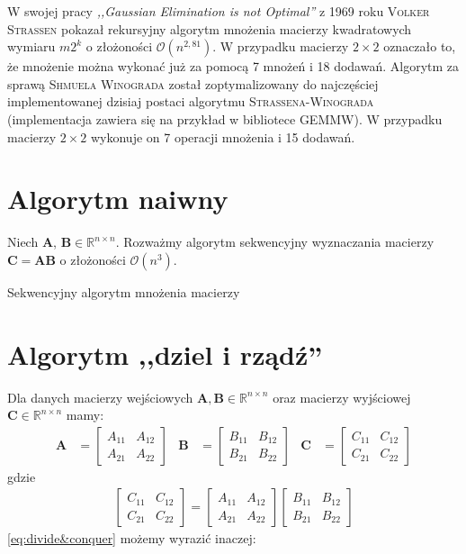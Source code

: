 W swojej pracy \emph{,,Gaussian Elimination is not Optimal''} z 1969 roku \textsc{Volker Strassen} pokazał rekursyjny algorytm mnożenia macierzy kwadratowych wymiaru \(m2^k\) o złożoności \(\mathcal{O}(n^{2,81})\)\cite{Strassen68}. W przypadku macierzy \(2\times 2\) oznaczało to, że mnożenie można wykonać już za pomocą 7 mnożeń i 18 dodawań. Algorytm za sprawą \textsc{Shmuela Winograda} został zoptymalizowany\cite{Winograd}\cite{Loeckx1974} do najczęściej implementowanej dzisiaj postaci algorytmu \textsc{Strassena-Winograda} (implementacja zawiera się na przykład w bibliotece GEMMW\cite{Douglas94gemmw}). W przypadku macierzy \(2\times 2\) wykonuje on 7 operacji mnożenia i 15 dodawań\cite{DBLP:journals/corr/abs-1202-3173}.
\section{Algorytm naiwny}
Niech \(\mathbf{A}\), \(\mathbf{B}\in\mathbb{R}^{n\times n}\). Rozważmy algorytm sekwencyjny wyznaczania macierzy \(\mathbf{C}=\mathbf{AB}\) o złożoności \(\mathcal{O}(n^3)\).

\begin{algorithm}
\caption{Sekwencyjny algorytm mnożenia macierzy}
\end{algorithm}
\newpage
\section{Algorytm ,,dziel i rządź''}
Dla danych macierzy wejściowych \(\mathbf{A}, \mathbf{B}\in\mathbb{R}^{n\times n}\) oraz macierzy wyjściowej \(\mathbf{C}\in\mathbb{R}^{n\times n}\) mamy:
\begin{align*}
\mathbf{A}& = \begin{bmatrix} A_{11}& A_{12} \\ A_{21}& A_{22} \end{bmatrix}&
\mathbf{B}& = \begin{bmatrix} B_{11}& B_{12} \\ B_{21}& B_{22} \end{bmatrix}&
\mathbf{C}& = \begin{bmatrix} C_{11}& C_{12} \\ C_{21}& C_{22} \end{bmatrix}
\end{align*}
gdzie
\begin{align}\label{eq:divide&conquer}
\begin{bmatrix} C_{11}& C_{12} \\ C_{21}& C_{22}\end{bmatrix}=
\begin{bmatrix} A_{11}& A_{12} \\ A_{21}& A_{22}\end{bmatrix}
\begin{bmatrix} B_{11}& B_{12} \\ B_{21}& B_{22}\end{bmatrix}
\end{align}
\eqref{eq:divide&conquer} możemy wyrazić inaczej:

